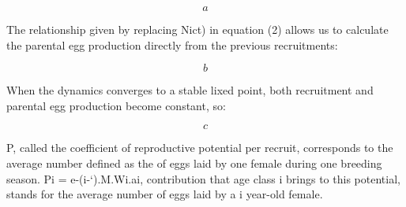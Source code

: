 \documentclass[%
nonumbib,      %
%
]{nrc1}                          %
\begin{document}
\begin{equation}
a
\end{equation}

The relationship given by replacing Nict) in equation (2) allows us to calculate the parental egg production directly from the previous recruitments:

\begin{equation}
b
\end{equation}

When the dynamics converges to a stable lixed point, both recruitment and parental egg production become constant, so:

\begin{equation}
c
\end{equation}

P, called the coefficient of reproductive potential per recruit, corresponds to the average number defined as the of eggs laid by one female during one breeding season. Pi = e-(i-‘).M.Wi.ai, contribution that age class i brings to this potential, stands for the average number of eggs laid
by a i year-old female.
\end{document}
